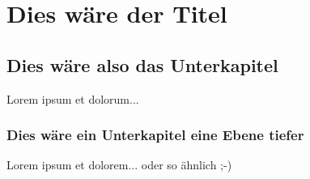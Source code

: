 \documentclass[paper=a4, fontsize=12bp]{scrreprt}
\begin{document}
\chapter{Dies wäre der Titel}
\section{Dies wäre also das Unterkapitel}
Lorem ipsum et dolorum...
\subsection{Dies wäre ein Unterkapitel eine Ebene tiefer}
Lorem ipsum et dolorem... oder so ähnlich ;-)
\end{document}
